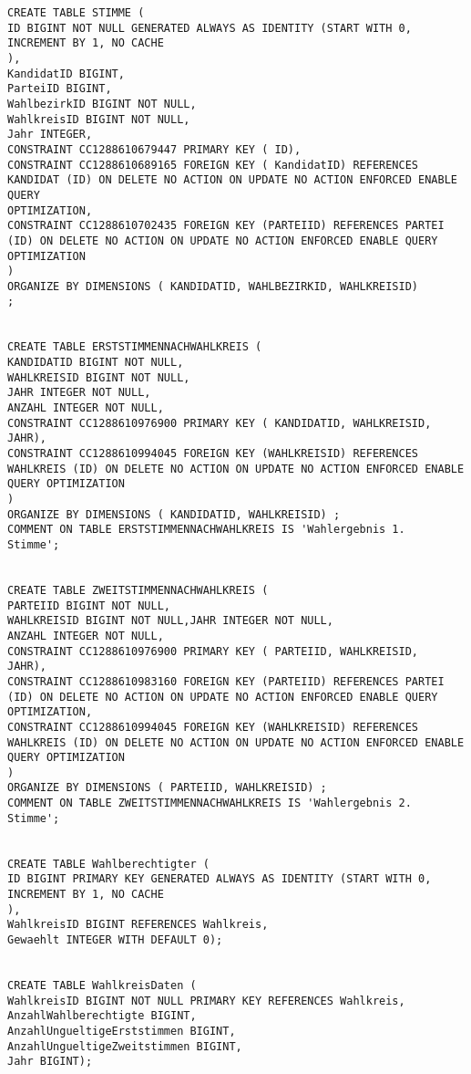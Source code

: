 \begin{lstlisting}
CREATE TABLE STIMME (
ID BIGINT NOT NULL GENERATED ALWAYS AS IDENTITY (START WITH 0, INCREMENT BY 1, NO CACHE
),
KandidatID BIGINT,
ParteiID BIGINT,
WahlbezirkID BIGINT NOT NULL,
WahlkreisID BIGINT NOT NULL,
Jahr INTEGER,
CONSTRAINT CC1288610679447 PRIMARY KEY ( ID),
CONSTRAINT CC1288610689165 FOREIGN KEY ( KandidatID) REFERENCES KANDIDAT (ID) ON DELETE NO ACTION ON UPDATE NO ACTION ENFORCED ENABLE QUERY
OPTIMIZATION,
CONSTRAINT CC1288610702435 FOREIGN KEY (PARTEIID) REFERENCES PARTEI (ID) ON DELETE NO ACTION ON UPDATE NO ACTION ENFORCED ENABLE QUERY OPTIMIZATION
)
ORGANIZE BY DIMENSIONS ( KANDIDATID, WAHLBEZIRKID, WAHLKREISID)
;


CREATE TABLE ERSTSTIMMENNACHWAHLKREIS (
KANDIDATID BIGINT NOT NULL,
WAHLKREISID BIGINT NOT NULL,
JAHR INTEGER NOT NULL,
ANZAHL INTEGER NOT NULL,
CONSTRAINT CC1288610976900 PRIMARY KEY ( KANDIDATID, WAHLKREISID,
JAHR),
CONSTRAINT CC1288610994045 FOREIGN KEY (WAHLKREISID) REFERENCES WAHLKREIS (ID) ON DELETE NO ACTION ON UPDATE NO ACTION ENFORCED ENABLE QUERY OPTIMIZATION
)
ORGANIZE BY DIMENSIONS ( KANDIDATID, WAHLKREISID) ;
COMMENT ON TABLE ERSTSTIMMENNACHWAHLKREIS IS 'Wahlergebnis 1.
Stimme';


CREATE TABLE ZWEITSTIMMENNACHWAHLKREIS (
PARTEIID BIGINT NOT NULL,
WAHLKREISID BIGINT NOT NULL,JAHR INTEGER NOT NULL,
ANZAHL INTEGER NOT NULL,
CONSTRAINT CC1288610976900 PRIMARY KEY ( PARTEIID, WAHLKREISID,
JAHR),
CONSTRAINT CC1288610983160 FOREIGN KEY (PARTEIID) REFERENCES PARTEI (ID) ON DELETE NO ACTION ON UPDATE NO ACTION ENFORCED ENABLE QUERY
OPTIMIZATION,
CONSTRAINT CC1288610994045 FOREIGN KEY (WAHLKREISID) REFERENCES WAHLKREIS (ID) ON DELETE NO ACTION ON UPDATE NO ACTION ENFORCED ENABLE QUERY OPTIMIZATION
)
ORGANIZE BY DIMENSIONS ( PARTEIID, WAHLKREISID) ;
COMMENT ON TABLE ZWEITSTIMMENNACHWAHLKREIS IS 'Wahlergebnis 2.
Stimme';


CREATE TABLE Wahlberechtigter (
ID BIGINT PRIMARY KEY GENERATED ALWAYS AS IDENTITY (START WITH 0, INCREMENT BY 1, NO CACHE
),
WahlkreisID BIGINT REFERENCES Wahlkreis,
Gewaehlt INTEGER WITH DEFAULT 0);


CREATE TABLE WahlkreisDaten (
WahlkreisID BIGINT NOT NULL PRIMARY KEY REFERENCES Wahlkreis,
AnzahlWahlberechtigte BIGINT,
AnzahlUngueltigeErststimmen BIGINT,
AnzahlUngueltigeZweitstimmen BIGINT,
Jahr BIGINT);
\end{lstlisting}